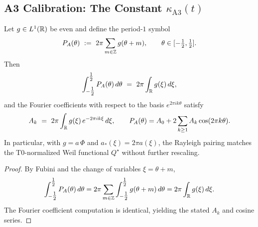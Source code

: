 
\subsection{A3 Calibration: The Constant \texorpdfstring{$\kappa_{\mathrm{A3}}(t)$}{κ\_A3(t)}}
\label{a3:sec:A3-calibration}

\begin{lemma}\label{lem:a3-period1-audit}
Let $g\in L^1(\mathbb R)$ be even and define the period-$1$ symbol
\[
  P_A(\theta)\ :=\ 2\pi\sum_{m\in\mathbb Z} g(\theta+m),\qquad \theta\in[-\tfrac12,\tfrac12].
\]
Then
\[
  \int_{-\tfrac12}^{\tfrac12} P_A(\theta)\,d\theta
  \ =\ 2\pi\int_{\mathbb R} g(\xi)\,d\xi,
\]
and the Fourier coefficients with respect to the basis $e^{2\pi i k\theta}$ satisfy
\[
  A_k\ =\ 2\pi\int_{\mathbb R} g(\xi)\,e^{-2\pi i k\xi}\,d\xi,
  \qquad
  P_A(\theta)=A_0+2\sum_{k\ge1}A_k\cos(2\pi k\theta).
\]
In particular, with $g=a\,\Phi$ and $a_*(\xi)=2\pi a(\xi)$, the Rayleigh pairing matches
the T0-normalized Weil functional $Q^\star$ without further rescaling.
\end{lemma}
\begin{proof}
By Fubini and the change of variables $\xi=\theta+m$,
\[
  \int_{-\tfrac12}^{\tfrac12} P_A(\theta)\,d\theta
  = 2\pi\sum_{m\in\mathbb Z}\int_{-\tfrac12}^{\tfrac12} g(\theta+m)\,d\theta
  = 2\pi\int_{\mathbb R} g(\xi)\,d\xi.
\]
The Fourier coefficient computation is identical, yielding the stated $A_k$ and cosine series.
\end{proof}

